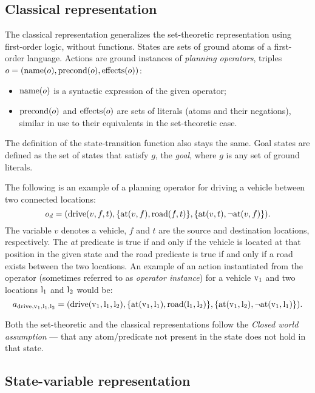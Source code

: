 \subsection{Classical representation}

The classical representation generalizes the set-theoretic representation using first-order logic,
without functions.
States are sets of ground atoms of a first-order language.
Actions are ground instances of \textit{planning operators},
triples $o = (\operatorname{\textrm{name}}(o), \operatorname{\textrm{precond}}(o), \operatorname{\textrm{effects}}(o))$:

\begin{itemize}
\item $\operatorname{\textrm{name}}(o)$ is a syntactic expression of the given operator;
\item $\operatorname{\textrm{precond}}(o)$ and $\operatorname{\textrm{effects}}(o)$ are sets of literals
(atoms and their negations), similar in use to their equivalents
in the set-theoretic case.
\end{itemize}
The definition of the state-transition function also stays the same.
Goal states are defined as the set of states that satisfy $g$,
the \textit{goal}, where $g$ is any set of ground literals.

The following is an example of a planning operator for driving a vehicle between two connected locations:
$$o_d = (\textrm{drive}(v, f, t), \{\textrm{at}(v, f), \textrm{road}(f, t)\}, \{\textrm{at}(v, t), \neg \textrm{at}(v, f)\}).$$
The variable $v$ denotes a vehicle, $f$ and $t$ are the source and destination locations, respectively. The \textit{at} predicate is true if and only if the vehicle is located at that position in the given state and the road predicate
is true if and only if a road exists between the two locations.
An example of an action instantiated from the operator (sometimes referred to as \textit{operator instance})
for a vehicle $\textrm{v}_1$ and two locations $\textrm{l}_1$ and $\textrm{l}_2$ would be:
$$a_{\textrm{drive}, \textrm{v}_1, \textrm{l}_1, \textrm{l}_2} = (\textrm{drive}(\textrm{v}_1, \textrm{l}_1, \textrm{l}_2), \{\textrm{at}(\textrm{v}_1, \textrm{l}_1),
\textrm{road}(\textrm{l}_1, \textrm{l}_2)\}, \{\textrm{at}(\textrm{v}_1, \textrm{l}_2), \neg \textrm{at}(\textrm{v}_1, \textrm{l}_1)\}).$$


Both the set-theoretic and the classical representations follow the \textit{Closed world assumption} --- that any atom/predicate not present in the state does not hold in that state.

\subsection{State-variable representation}

